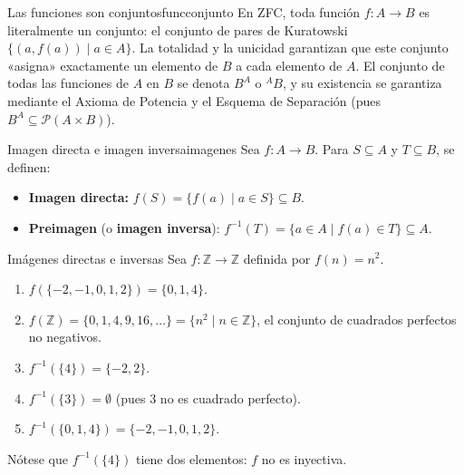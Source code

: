 \begin{observacion}{Las funciones son conjuntos}{funcconjunto}
En ZFC, toda función $f: A \to B$ es literalmente un conjunto: el conjunto de pares de Kuratowski $\{(a, f(a)) \mid a \in A\}$. La totalidad y la unicidad garantizan que este conjunto «asigna» exactamente un elemento de $B$ a cada elemento de $A$. El conjunto de todas las funciones de $A$ en $B$ se denota $B^A$ o ${}^{A}B$, y su existencia se garantiza mediante el Axioma de Potencia y el Esquema de Separación (pues $B^A \subseteq \mathcal{P}(A \times B)$).
\end{observacion}

\begin{definicion}{Imagen directa e imagen inversa}{imagenes}
Sea $f: A \to B$. Para $S \subseteq A$ y $T \subseteq B$, se definen:
\begin{itemize}[leftmargin=2em]
  \item \textbf{Imagen directa:} $f(S) = \{f(a) \mid a \in S\} \subseteq B$.
  \item \textbf{Preimagen} (o \textbf{imagen inversa}): $f^{-1}(T) = \{a \in A \mid f(a) \in T\} \subseteq A$.
\end{itemize}
\end{definicion}

\begin{ejemplo}{Imágenes directas e inversas}{}
Sea $f: \mathbb{Z} \to \mathbb{Z}$ definida por $f(n) = n^2$.
\begin{enumerate}[leftmargin=2em, label=(\alph*)]
  \item $f(\{-2, -1, 0, 1, 2\}) = \{0, 1, 4\}$.
  \item $f(\mathbb{Z}) = \{0, 1, 4, 9, 16, \ldots\} = \{n^2 \mid n \in \mathbb{Z}\}$, el conjunto de cuadrados perfectos no negativos.
  \item $f^{-1}(\{4\}) = \{-2, 2\}$.
  \item $f^{-1}(\{3\}) = \emptyset$ (pues $3$ no es cuadrado perfecto).
  \item $f^{-1}(\{0, 1, 4\}) = \{-2, -1, 0, 1, 2\}$.
\end{enumerate}
Nótese que $f^{-1}(\{4\})$ tiene dos elementos: $f$ no es inyectiva.
\end{ejemplo}

